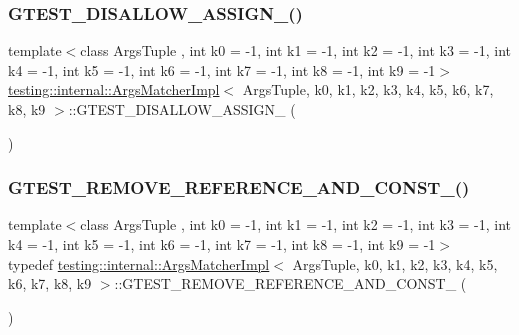\subsubsection{\texorpdfstring{G\+T\+E\+S\+T\+\_\+\+D\+I\+S\+A\+L\+L\+O\+W\+\_\+\+A\+S\+S\+I\+G\+N\+\_\+()}{GTEST\_DISALLOW\_ASSIGN\_()}}
{\footnotesize\ttfamily template$<$class Args\+Tuple , int k0 = -\/1, int k1 = -\/1, int k2 = -\/1, int k3 = -\/1, int k4 = -\/1, int k5 = -\/1, int k6 = -\/1, int k7 = -\/1, int k8 = -\/1, int k9 = -\/1$>$ \\
\hyperlink{classtesting_1_1internal_1_1ArgsMatcherImpl}{testing\+::internal\+::\+Args\+Matcher\+Impl}$<$ Args\+Tuple, k0, k1, k2, k3, k4, k5, k6, k7, k8, k9 $>$\+::G\+T\+E\+S\+T\+\_\+\+D\+I\+S\+A\+L\+L\+O\+W\+\_\+\+A\+S\+S\+I\+G\+N\+\_\+ (\begin{DoxyParamCaption}\item[{\hyperlink{classtesting_1_1internal_1_1ArgsMatcherImpl}{Args\+Matcher\+Impl}$<$ Args\+Tuple, k0, k1, k2, k3, k4, k5, k6, k7, k8, k9 $>$}]{ }\end{DoxyParamCaption})\hspace{0.3cm}{\ttfamily [private]}}

\mbox{\label{classtesting_1_1internal_1_1ArgsMatcherImpl_a7b0cadc369c0c20cd254cc2052782301}} 
\subsubsection{\texorpdfstring{G\+T\+E\+S\+T\+\_\+\+R\+E\+M\+O\+V\+E\+\_\+\+R\+E\+F\+E\+R\+E\+N\+C\+E\+\_\+\+A\+N\+D\+\_\+\+C\+O\+N\+S\+T\+\_\+()}{GTEST\_REMOVE\_REFERENCE\_AND\_CONST\_()}}
{\footnotesize\ttfamily template$<$class Args\+Tuple , int k0 = -\/1, int k1 = -\/1, int k2 = -\/1, int k3 = -\/1, int k4 = -\/1, int k5 = -\/1, int k6 = -\/1, int k7 = -\/1, int k8 = -\/1, int k9 = -\/1$>$ \\
typedef \hyperlink{classtesting_1_1internal_1_1ArgsMatcherImpl}{testing\+::internal\+::\+Args\+Matcher\+Impl}$<$ Args\+Tuple, k0, k1, k2, k3, k4, k5, k6, k7, k8, k9 $>$\+::G\+T\+E\+S\+T\+\_\+\+R\+E\+M\+O\+V\+E\+\_\+\+R\+E\+F\+E\+R\+E\+N\+C\+E\+\_\+\+A\+N\+D\+\_\+\+C\+O\+N\+S\+T\+\_\+ (\begin{DoxyParamCaption}\item[{Args\+Tuple}]{ }\end{DoxyParamCaption})}


